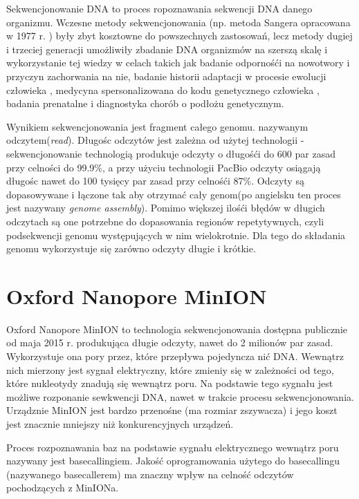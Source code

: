 \documentclass[a4paper,11pt,twoside]{report}
\theoremstyle{definition}
\begin{document}
Sekwencjonowanie DNA to proces ropoznawania sekwencji DNA danego organizmu. Wczesne metody sekwencjonowania (np. metoda Sangera opracowana w 1977 r. \cite{sequencingTechnologies}) były zbyt kosztowne do powszechnych zastosowań, lecz metody dugiej i trzeciej generacji umożliwiły zbadanie DNA organizmów na szerszą skalę i wykorzystanie tej wiedzy w celach takich jak badanie odpornośći na nowotwory\cite{cancerImmunity} i przyczyn zachorwania na nie\cite{cancerNonCoding}, badanie historii adaptacji w procesie ewolucji człowieka \cite{adaptation}, medycyna spersonalizowana do kodu genetycznego człowieka \cite{personalizedMedicine}, badania prenatalne \cite{prenatal} i diagnostyka chorób o podłożu genetycznym\cite{diagnosis}.

Wynikiem sekwencjonowania jest fragment całego genomu. nazywanym odczytem(\textit{read}). Długośc odczytów jest zależna od użytej technologii - sekwencjonowanie technologią produkuje odczyty o długośći do 600 par zasad przy celności do 99.9\%, a przy użyciu technologii PacBio odczyty osiągają długośc nawet do 100 tysięcy par zasad przy celnośći 87\%. Odczyty są dopasowywane i łączone tak aby otrzymać cały genom(po angielsku ten proces jest nazywany \textit{genome assembly}).  Pomimo większej ilośći błędów w długich odczytach są one potrzebne do dopasowania regionów repetytywnych, czyli podsekwencji genomu występujących w nim wielokrotnie. Dla tego do składania genomu wykorzystuje się zarówno odczyty długie i krótkie.

\section*{Oxford Nanopore MinION}

Oxford Nanopore MinION to technologia sekwencjonowania dostępna publicznie od maja 2015 r. produkująca długie odczyty, nawet do 2 milionów par zasad. Wykorzystuje ona pory przez, które przepływa pojedyncza nić DNA. Wewnątrz nich mierzony jest sygnał elektryczny, które zmieniy się w zależności od tego, które nukleotydy znadują się wewnątrz poru. Na podstawie tego sygnału jest możliwe rozponanie sewkwencji DNA, nawet w trakcie procesu sekwencjonowania. Urządznie MinION jest bardzo przenośne (ma rozmiar zszywacza) i jego koszt jest znacznie mniejszy niż konkurencyjnych urządzeń. 

Proces rozpoznawania baz na podstawie sygnału elektrycznego wewnątrz poru nazywany jest basecallingiem. Jakość oprogramowania użytego do basecallingu (nazywanego basecallerem) ma znaczny wpływ na celność odczytów pochodzących z MinIONa.
\end{document}
